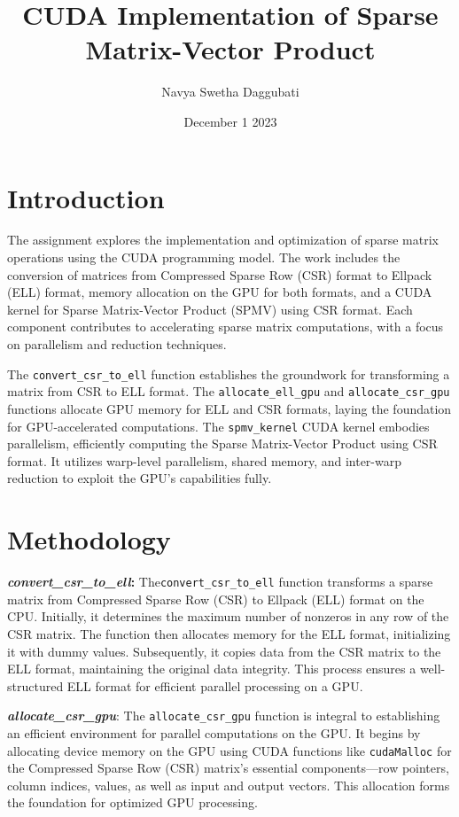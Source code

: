 \documentclass[11pt, twocolumn]{article}
\title{CUDA Implementation of Sparse Matrix-Vector Product}
\author{Navya Swetha Daggubati}
\date{December 1 2023}
\begin{document}
\maketitle

\section{Introduction}

The assignment explores the implementation and optimization of sparse matrix operations using the CUDA programming model. The work includes the conversion of matrices from Compressed Sparse Row (CSR) format to Ellpack (ELL) format, memory allocation on the GPU for both formats, and a CUDA kernel for Sparse Matrix-Vector Product (SPMV) using CSR format. Each component contributes to accelerating sparse matrix computations, with a focus on parallelism and reduction techniques.

The \texttt{convert\_csr\_to\_ell} function establishes the groundwork for transforming a matrix from CSR to ELL format. The \texttt{allocate\_ell\_gpu} and \texttt{allocate\_csr\_gpu} functions allocate GPU memory for ELL and CSR formats, laying the foundation for GPU-accelerated computations. The \texttt{spmv\_kernel} CUDA kernel embodies parallelism, efficiently computing the Sparse Matrix-Vector Product using CSR format. It utilizes warp-level parallelism, shared memory, and inter-warp reduction to exploit the GPU's capabilities fully.

\section{Methodology}

\textbf{\textit{convert\_csr\_to\_ell}:} 
The\texttt{convert\_csr\_to\_ell} function transforms a sparse matrix from Compressed Sparse Row (CSR) to Ellpack (ELL) format on the CPU. Initially, it determines the maximum number of nonzeros in any row of the CSR matrix. The function then allocates memory for the ELL format, initializing it with dummy values. Subsequently, it copies data from the CSR matrix to the ELL format, maintaining the original data integrity. This process ensures a well-structured ELL format for efficient parallel processing on a GPU.

\textbf{\textit{allocate\_csr\_gpu}}: 
The \texttt{allocate\_csr\_gpu} function is integral to establishing an efficient environment for parallel computations on the GPU. It begins by allocating device memory on the GPU using CUDA functions like \texttt{cudaMalloc} for the Compressed Sparse Row (CSR) matrix's essential components—row pointers, column indices, values, as well as input and output vectors. This allocation forms the foundation for optimized GPU processing.
\end{document}
